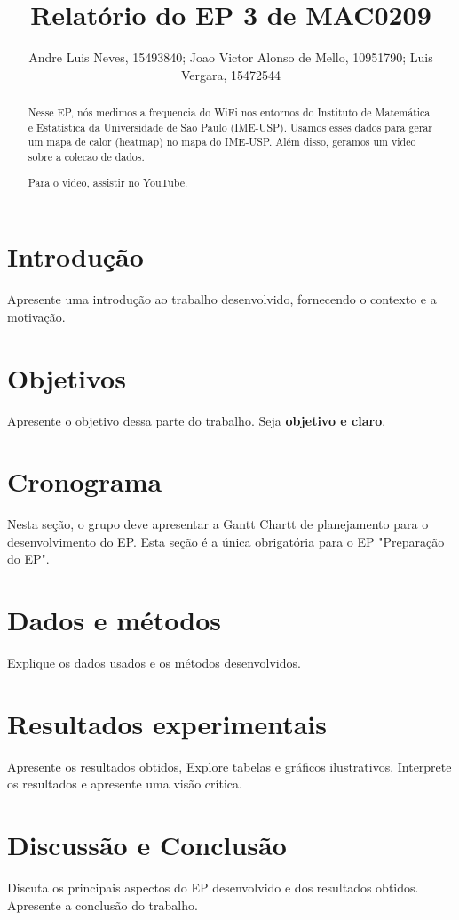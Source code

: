 \documentclass{article}
\title{Relatório do EP 3 de MAC0209}
\author{Andre Luis Neves, 15493840; Joao Victor Alonso de Mello, 10951790; Luis Vergara, 15472544}
\begin{document}
\maketitle


\begin{abstract}
  Nesse EP, nós medimos a frequencia do WiFi nos entornos do Instituto de Matemática e Estatística
  da Universidade de Sao Paulo (IME-USP). Usamos esses dados para gerar um mapa de calor (heatmap)
  no mapa do IME-USP. Além disso, geramos um video sobre a colecao de dados. 

Para o video, \href{https://youtube.com}{assistir no YouTube}.

\end{abstract}

\newpage

\tableofcontents

\newpage

\section{Introdução}

Apresente uma introdução ao trabalho desenvolvido, fornecendo o contexto e a motivação.

\section{Objetivos}

Apresente o objetivo dessa parte do trabalho. Seja {\bf objetivo e claro}.

\section{Cronograma}

Nesta seção, o grupo deve apresentar a Gantt Chartt de planejamento para o desenvolvimento do EP. Esta seção é a única obrigatória para o EP "Preparação do EP".

\section{Dados e métodos}

Explique os dados usados e os métodos desenvolvidos.

\section{Resultados experimentais}

Apresente os resultados obtidos, Explore tabelas e gráficos ilustrativos. Interprete os resultados e apresente uma visão crítica.

\section{Discussão e Conclusão}

Discuta os principais aspectos do EP desenvolvido e dos resultados obtidos. Apresente a conclusão do trabalho.
\end{document}
